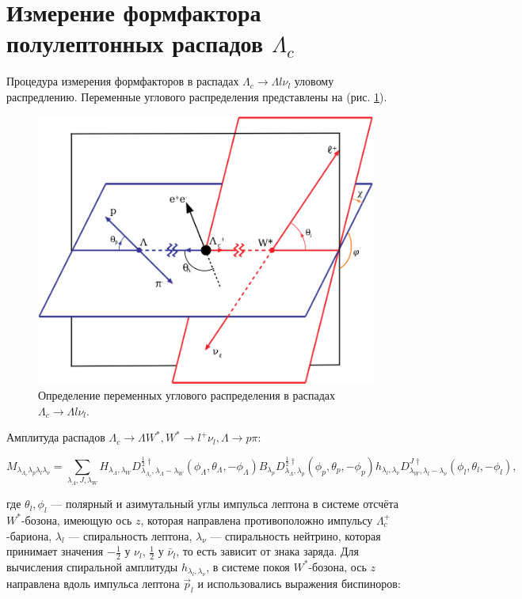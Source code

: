 \section{Измерение формфактора полулептонных распадов $\Lambda_c$}

Процедура измерения формфакторов в распадах $\Lambda_c \to \Lambda l \nu_l$
уловому распредлению. Переменные углового распределения представлены 
на (рис. \ref{lc_l_l_nu:def}). 

\begin{figure}[H]
    \centering
    \includegraphics[width=0.7\linewidth]{img/lc_l_l_nu_def.png}
    \caption{Определение переменных углового распределения в распадах  $\Lambda_c \to \Lambda l \nu_l$.}
    \label{lc_l_l_nu:def}
\end{figure}

Амплитуда распадов 
$\Lambda_c \to \Lambda W^*, W^* \to l^+ \nu_l, \Lambda \to p \pi$:


\begin{equation}
    M_{\lambda_{\Lambda_c}\lambda_{p}\lambda_{l}\lambda_{\nu}} 
    = 
    \sum_{\lambda_{\Lambda},J,\lambda_{W}} H_{\lambda_{\Lambda},\lambda_{W}} D^{\frac{1}{2} \dagger}_{\lambda_{\Lambda_c},\lambda_{\Lambda}-\lambda_{W}}(\phi_{\Lambda}, \theta_{\Lambda}, -\phi_{\Lambda}) B_{\lambda_{p}} D^{\frac{1}{2} \dagger}_{\lambda_{\Lambda},\lambda_{p}}(\phi_{p}, \theta_{p}, -\phi_{p}) h_{\lambda_{l},\lambda_{\nu}} D^{J \dagger}_{\lambda_{W},\lambda_{l}-\lambda_{\nu}}(\phi_{l}, \theta_{l}, -\phi_{l}),
\end{equation}


где $\theta_l, \phi_l$ --- полярный и азимутальный углы импульса лептона 
в системе отсчёта  $W^*$-бозона, имеющую ось $z$, которая направлена 
противоположно импульсу $\Lambda^+_c $-бариона, 
$\lambda_l$ --- спиральность лептона, 
$\lambda_\nu$ --- спиральность нейтрино, 
которая принимает значения $-\frac{1}{2}$ у $\nu_l$, $\frac{1}{2}$ у $\bar \nu_l$, 
то есть зависит от знака заряда. 
Для вычисления спиральной амплитуды $h_{\lambda_l, \lambda_\nu}$, 
в системе покоя $W^*$-бозона, ось $z$ направлена вдоль импульса лептона 
$\vec{p}_l$ и использовались выражения биспиноров:

